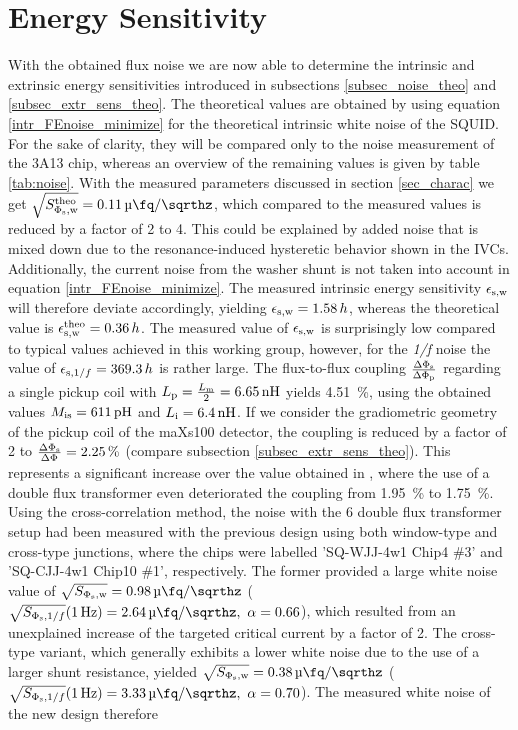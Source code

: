 \section{Energy Sensitivity}

With the obtained flux noise we are now able to determine the intrinsic and extrinsic energy sensitivities introduced in subsections \ref{subsec_noise_theo} and \ref{subsec_extr_sens_theo}. The theoretical values are obtained by using equation \ref{intr_FEnoise_minimize} for the theoretical intrinsic white noise of the SQUID. For the sake of clarity, they will be compared only to the noise measurement of the 3A13 chip, whereas an overview of the remaining values is given by table \ref{tab:noise}. With the measured parameters discussed in section \ref{sec_charac} we get $\sqrt{S_{\rm \Phi_{\rm s},w}^{\rm theo}}=\qty{0.11}{\micro\fq\per\sqrthz}$, which compared to the measured values is reduced by a factor of 2 to 4. This could be explained by added noise that is mixed down due to the resonance-induced hysteretic behavior shown in the IVCs. Additionally, the current noise from the washer shunt is not taken into account in equation \ref{intr_FEnoise_minimize}. The measured intrinsic energy sensitivity $\epsilon_{\rm s,w}$ will therefore deviate accordingly, yielding $\epsilon_{\rm s,w}=1.58\, h$, whereas the theoretical value is $\epsilon_{\rm s,w}^{\rm theo}=0.36\, h$. The measured value of $\epsilon_{\rm s,w}$ is surprisingly low compared to typical values achieved in this working group, however, for the \textit{1/f} noise the value of $\epsilon_{{\rm s},1/f}=369.3\, h$ is rather large. The flux-to-flux coupling $\frac{\Delta\Phi_{\rm s}}{\Delta\Phi_{\rm p}}$ regarding a single pickup coil with $L_{\rm p}=\frac{L_{\rm m}}{2}=\qty{6.65}{\nH}$ yields \qty{4.51}{\percent}, using the obtained values $M_{\rm is}=\qty{611}{\pH}$ and  $L_{\rm i}=\qty{6.4}{\nH}$. If we consider the gradiometric geometry of the pickup coil of the maXs100 detector, the coupling is reduced by a factor of 2 to $\frac{\Delta\Phi_{\rm s}}{\Delta\Phi_{\rm }}=\qty{2.25}{\percent}$ (compare subsection \ref{subsec_extr_sens_theo}). This represents a significant increase over the value obtained in \cite{Bauer2022}, where the use of a double flux transformer even deteriorated the coupling from \qty{1.95}{\percent} to \qty{1.75}{\percent}. Using the cross-correlation method, the noise with the \qty{6}{\nH} double flux transformer setup had been measured with the previous design using both window-type and cross-type junctions, where the chips were labelled 'SQ-WJJ-4w1 Chip4 $\#$3' and 'SQ-CJJ-4w1 Chip10 $\#$1', respectively. The former provided a large white noise value of $\sqrt{S_{\rm \Phi_{\rm s},w}}=\qty{0.98}{\micro\fq\per\sqrthz}$ ($\sqrt{S_{\Phi_{\rm s},1/f}}(\qty{1}{\Hz})=\qty{2.64}{\micro\fq\per\sqrthz},\ \alpha = 0.66$), which resulted from an unexplained increase of the targeted critical current by a factor of 2. The cross-type variant, which generally exhibits a lower white noise due to the use of a larger shunt resistance, yielded $\sqrt{S_{\rm \Phi_{\rm s},w}}=\qty{0.38}{\micro\fq\per\sqrthz}$ ($\sqrt{S_{\Phi_{\rm s},1/f}}(\qty{1}{\Hz})=\qty{3.33}{\micro\fq\per\sqrthz},\ \alpha = 0.70$). The measured white noise of the new design therefore 